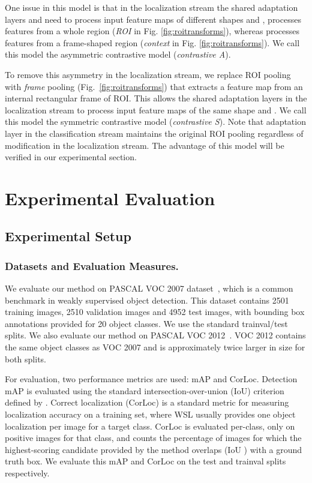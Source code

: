 \documentclass[runningheads]{llncs}
\begin{document}
One issue in this model is that in the localization stream the shared adaptation layers  and  need to process input feature maps of different shapes  and , \ie   processes features from a whole region ({\em ROI} in Fig. \ref{fig:roitransforms}), whereas  processes features from a frame-shaped region ({\em context} in Fig. \ref{fig:roitransforms}). We call this model the asymmetric contrastive model ({\em contrastive A}).  

To remove this asymmetry in the localization stream, we replace ROI pooling with {\em frame} pooling (Fig.~\ref{fig:roitransforms}) that extracts a feature map from an internal rectangular frame of ROI. This allows the shared adaptation layers in the localization stream to process input feature maps of the same shape  and . We call this model the symmetric contrastive model ({\em contrastive S}). Note that adaptation layer  in the classification stream maintains the original ROI pooling 
regardless of modification in the localization stream. The advantage of this
model will be verified in our experimental section.  

 
\section{Experimental Evaluation}
\subsection{Experimental Setup} 
 \subsubsection{Datasets and Evaluation Measures.}

We evaluate our method on PASCAL VOC 2007 dataset~\cite{Everingham10}, which is
a common benchmark in weakly supervised object detection. This dataset contains
2501 training images, 2510 validation images and 4952 test images, with
bounding box annotations provided for 20 object classes. We use the standard
trainval/test splits. 
We also evaluate our method on PASCAL VOC 2012~\cite{pascal-voc-2012}. VOC 2012 contains the same 
object classes as VOC 2007 and is approximately twice larger in size for both splits.

For evaluation, two performance metrics are used: mAP and CorLoc. 
Detection mAP is evaluated using the standard
intersection-over-union (IoU) criterion defined by \cite{Everingham10}.
Correct localization (CorLoc) \cite{Deselaers:2012ci} is a standard metric 
for measuring localization accuracy on a training set, 
where WSL usually provides one object localization per image for a target class.  
CorLoc is evaluated per-class, only on positive images for
that class, and counts the percentage of images for which the highest-scoring
candidate provided by the method overlaps (IoU ) with a ground truth box.
We evaluate this mAP and CorLoc on the test and trainval splits respectively. 
\end{document}
